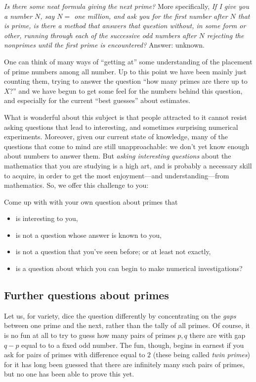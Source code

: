 \documentclass[11pt]{article}
\theoremstyle{plain}
\theoremstyle{definition}
\numberwithin{equation}{section}
\numberwithin{figure}{section}
\numberwithin{table}{section}
\begin{document}
\bigskip


{\em Is there some neat formula giving the next prime?} More
specifically, {\em If I give you a number $N$, say $N=$ one million,
  and ask you for the first number after $N$ that is prime, is there a
  method that answers that question without, in some form or other,
  running through each of the successive odd numbers after $N$ rejecting
  the nonprimes until the first prime is encountered?}  Answer:
unknown.

\bigskip

One can think of many ways of ``getting at'' some understanding of the
placement of prime numbers among all number.  Up to this point we have
been mainly just counting them, trying to answer the question ``how
many primes are there up to $X$?''  and we have begun to get some feel
for the numbers behind this question, and especially for the current
``best guesses'' about estimates.
   

What is wonderful about this subject is that people attracted to it
cannot resist asking questions that lead to interesting, and sometimes
surprising numerical experiments. Moreover, given our current state of
knowledge, many of the questions that come to mind are still
unapproachable: we don't yet know enough about numbers to answer them.
But {\it asking interesting questions} about the mathematics that you
are studying is a high art, and is probably a necessary skill to
acquire, in order to get the most enjoyment---and understanding---from
mathematics.  So, we offer this challenge to you:

Come up with with your own question about primes that
 \begin{itemize}
 \item     is interesting to you,
  \item    is not a question whose answer is known to you,
 \item     is not a question that you've seen before; or at least not exactly,
  \item    is a question about which you can begin to make numerical investigations? 
 \end{itemize}
 
\subsection{Further questions about primes} 

Let us, for variety, dice the question differently by concentrating on
the {\em gaps} between one prime and the next, rather than the tally
of all primes. Of course, it is no fun at all to try to guess how many
pairs of primes $p, q$ there are with gap $q-p$ equal to to a fixed
odd number.  The fun, though, begins in earnest if you ask for pairs
of primes with difference equal to $2$ (these being called {\em twin
  primes}) for it has long been guessed that there are infinitely many
such pairs of primes, but no one has been able to prove this yet.
\end{document}
